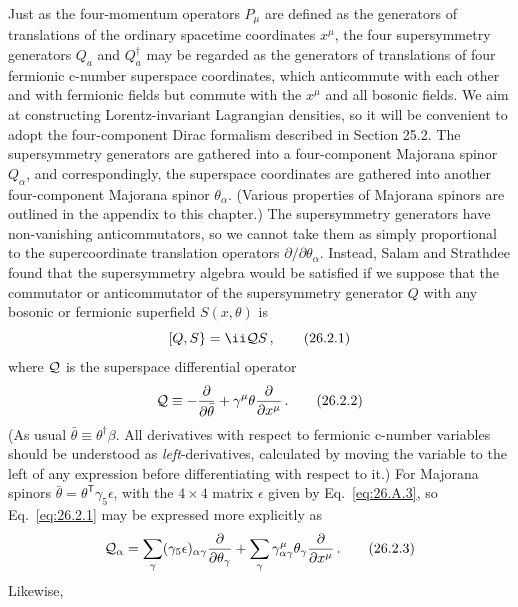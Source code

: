 Just as the four-momentum operators $P_\mu$ are defined as the generators of
translations of the ordinary spacetime coordinates $x^\mu$, the four
supersymmetry generators $Q_a$ and $Q_a^\dagger$ may be regarded as the
generators of translations of four fermionic c-number superspace coordinates,
which anticommute with each other and with fermionic fields but commute with
the $x^\mu$ and all bosonic fields. We aim at constructing Lorentz-invariant
Lagrangian densities, so it will be convenient to adopt the four-component
Dirac formalism described in Section 25.2. The supersymmetry generators are
gathered into a four-component Majorana spinor $Q_\alpha$, and
correspondingly, the superspace coordinates are gathered into another
four-component Majorana spinor $\theta_\alpha$. (Various properties of
Majorana spinors are outlined in the appendix to this chapter.) The
supersymmetry generators have non-vanishing anticommutators, so we cannot take
them as simply proportional to the supercoordinate translation operators
$\partial/\partial\theta_\alpha$. Instead, Salam and Strathdee found that the
supersymmetry algebra would be satisfied if we suppose that the commutator or
anticommutator of the supersymmetry generator $Q$ with any bosonic or
fermionic superfield $S(x,\theta)$ is
\begin{equation}
  \gradedbracket{Q}{S}=\ii\SuperQ S\,,
  \tag{26.2.1}\label{eq:26.2.1}
\end{equation}
where $\mathcal{Q}$ is the superspace differential operator
\begin{equation}
  \mathcal{Q}\equiv
  -\frac{\partial}{\partial\bar\theta}
  +\gamma^\mu\theta\frac{\partial}{\partial x^\mu}\,.
  \tag{26.2.2}\label{eq:26.2.2}
\end{equation}
(As usual $\bar\theta\equiv\theta^\dagger\beta$. All derivatives with respect
to fermionic c-number variables should be understood as
\emph{left}-derivatives, calculated by moving the variable to the left of any
expression before differentiating with respect to it.) For Majorana spinors
$\bar\theta=\theta^{\mathsf T}\gamma_5\epsilon$, with the $4\times4$ matrix $\epsilon$
given by Eq.~\eqref{eq:26.A.3}, so Eq.~\eqref{eq:26.2.1} may be expressed more
explicitly as
\begin{equation}
  \mathcal{Q}_\alpha
  =\sum_\gamma(\gamma_5\epsilon)_{\alpha\gamma}
    \frac{\partial}{\partial\theta_\gamma}
  +\sum_\gamma\gamma^\mu_{\alpha\gamma}\theta_\gamma
    \frac{\partial}{\partial x^\mu}\,.
  \tag{26.2.3}\label{eq:26.2.3}
\end{equation}
Likewise,
